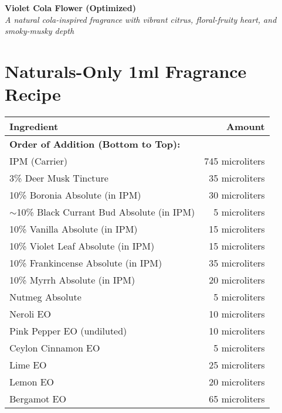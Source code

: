 \documentclass{article}
\begin{document}
\begin{center}
\textcolor{violetPurple}{\LARGE\textbf{Violet Cola Flower (Optimized)}}\\[0.5cm]
\textcolor{colaBrown}{\large\textit{A natural cola-inspired fragrance with vibrant citrus, floral-fruity heart, and smoky-musky depth}}\\[0.5cm]
\end{center}

\section*{Naturals-Only 1ml Fragrance Recipe}

\begin{center}
\begin{tabular}{p{6.5cm}r}
\toprule
\textcolor{colaRed}{\textbf{Ingredient}} & \textcolor{colaRed}{\textbf{Amount}} \\
\midrule
\multicolumn{2}{l}{\textcolor{violetPurple}{\textbf{Order of Addition (Bottom to Top):}}} \\
\midrule
IPM (Carrier) & 745 microliters \\
3\% Deer Musk Tincture & 35 microliters \\
10\% Boronia Absolute (in IPM) & 30 microliters \\
$\sim$10\% Black Currant Bud Absolute (in IPM) & 5 microliters \\
10\% Vanilla Absolute (in IPM) & 15 microliters \\
10\% Violet Leaf Absolute (in IPM) & 15 microliters \\
10\% Frankincense Absolute (in IPM) & 35 microliters \\
10\% Myrrh Absolute (in IPM) & 20 microliters \\
Nutmeg Absolute & 5 microliters \\
Neroli EO & 10 microliters \\
Pink Pepper EO (undiluted) & 10 microliters \\
Ceylon Cinnamon EO & 5 microliters \\
Lime EO & 25 microliters \\
Lemon EO & 20 microliters \\
Bergamot EO & 65 microliters \\
\bottomrule
\end{tabular}
\end{center}

\vspace{0.5cm}
\end{document}
